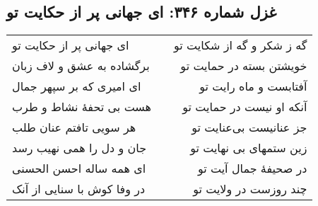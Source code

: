 \begin{center}
\section*{غزل شماره ۳۴۶: ای جهانی پر از حکایت تو}
\label{sec:346}
\begin{longtable}{l p{0.5cm} r}
ای جهانی پر از حکایت تو
&&
گه ز شکر و گه از شکایت تو
\\
برگشاده به عشق و لاف زبان
&&
خویشتن بسته در حمایت تو
\\
ای امیری که بر سپهر جمال
&&
آفتابست و ماه رایت تو
\\
هست بی تحفهٔ نشاط و طرب
&&
آنکه او نیست در حمایت تو
\\
هر سویی تافتم عنان طلب
&&
جز عنانیست بی‌عنایت تو
\\
جان و دل را همی نهیب رسد
&&
زین ستمهای بی نهایت تو
\\
ای همه ساله احسن الحسنی
&&
در صحیفهٔ جمال آیت تو
\\
در وفا کوش با سنایی از آنک
&&
چند روزست در ولایت تو
\\
\end{longtable}
\end{center}
